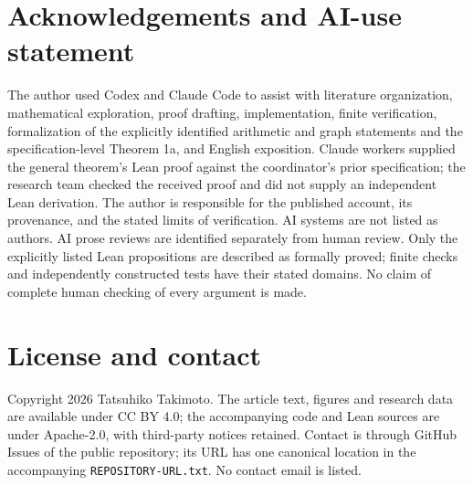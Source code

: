 \documentclass[11pt]{amsart}
\newcommand{\record}[1]{\nolinkurl{#1}}
\theoremstyle{definition}\newtheorem{definition}{Definition}
\begin{document}
\section*{Acknowledgements and AI-use statement}
The author used Codex and Claude Code
to assist with literature organization, mathematical exploration,
proof drafting, implementation, finite verification, formalization of
the explicitly identified arithmetic and graph statements and the
specification-level Theorem 1a, and English exposition. Claude workers
supplied the general theorem's Lean proof against the coordinator's
prior specification; the research team checked the received proof and
did not supply an independent Lean derivation. The author is responsible
for the published account, its provenance, and the stated limits of
verification. AI systems are not listed as authors. AI prose reviews
are identified separately from human review. Only the explicitly
listed Lean propositions are described as formally proved; finite
checks and independently constructed tests have their stated domains.
No claim of complete human checking of every argument is made.

\section*{License and contact}
Copyright 2026 Tatsuhiko Takimoto. The article text, figures and research
data are available under CC BY 4.0; the accompanying code and Lean
sources are under Apache-2.0, with third-party notices retained.
Contact is through GitHub Issues of the public repository; its URL
has one canonical location in the accompanying
\record{REPOSITORY-URL.txt}. No contact email is listed.
\end{document}
